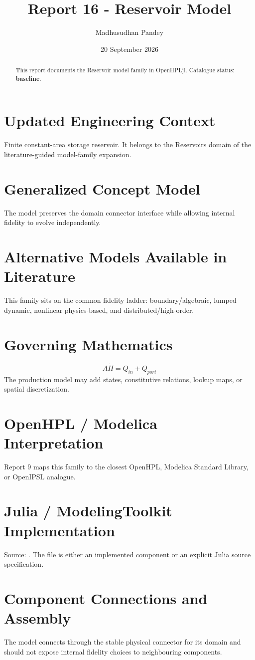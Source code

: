 \documentclass[10pt,a4paper]{article}
\title{Report 16 - Reservoir Model}
\author{Madhusudhan Pandey}
\date{20 September 2026}
\begin{document}
\maketitle
\begin{abstract}
This report documents the Reservoir model family in OpenHPLjl. Catalogue status: \textbf{baseline}.
\end{abstract}
\section{Updated Engineering Context}
Finite constant-area storage reservoir. It belongs to the Reservoirs domain of the literature-guided model-family expansion.
\section{Generalized Concept Model}
The model preserves the domain connector interface while allowing internal fidelity to evolve independently.
\section{Alternative Models Available in Literature}
This family sits on the common fidelity ladder: boundary/algebraic, lumped dynamic, nonlinear physics-based, and distributed/high-order.
\section{Governing Mathematics}
\[A\dot H=Q_{in}+Q_{port}\]
The production model may add states, constitutive relations, lookup maps, or spatial discretization.
\section{OpenHPL / Modelica Interpretation}
Report 9 maps this family to the closest OpenHPL, Modelica Standard Library, or OpenIPSL analogue.
\section{Julia / ModelingToolkit Implementation}
Source: \texttt{}. The file is either an implemented component or an explicit Julia source specification.
\section{Component Connections and Assembly}
The model connects through the stable physical connector for its domain and should not expose internal fidelity choices to neighbouring components.
\end{document}
